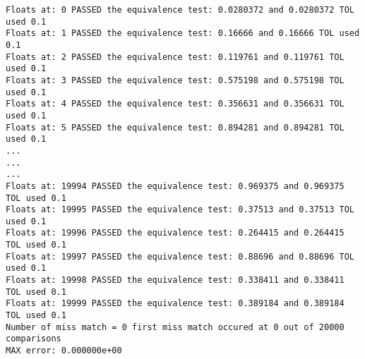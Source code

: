 \begin{lstlisting}[caption={Sample report when comparing 20000 elements of float data type and using absolute tolerance of 0.1}, label=code:sampleOUT,frame=single,style=Cstyle]
 Floats at: 0 PASSED the equivalence test: 0.0280372 and 0.0280372 TOL used 0.1
Floats at: 1 PASSED the equivalence test: 0.16666 and 0.16666 TOL used 0.1
Floats at: 2 PASSED the equivalence test: 0.119761 and 0.119761 TOL used 0.1
Floats at: 3 PASSED the equivalence test: 0.575198 and 0.575198 TOL used 0.1
Floats at: 4 PASSED the equivalence test: 0.356631 and 0.356631 TOL used 0.1
Floats at: 5 PASSED the equivalence test: 0.894281 and 0.894281 TOL used 0.1
...
...
...
Floats at: 19994 PASSED the equivalence test: 0.969375 and 0.969375 TOL used 0.1
Floats at: 19995 PASSED the equivalence test: 0.37513 and 0.37513 TOL used 0.1
Floats at: 19996 PASSED the equivalence test: 0.264415 and 0.264415 TOL used 0.1
Floats at: 19997 PASSED the equivalence test: 0.88696 and 0.88696 TOL used 0.1
Floats at: 19998 PASSED the equivalence test: 0.338411 and 0.338411 TOL used 0.1
Floats at: 19999 PASSED the equivalence test: 0.389184 and 0.389184 TOL used 0.1
Number of miss match = 0 first miss match occured at 0 out of 20000 comparisons
MAX error: 0.000000e+00

\end{lstlisting}
